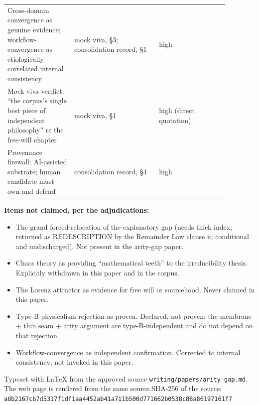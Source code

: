 \documentclass[11pt]{article}
\begin{document}
{\begin{longtable}{>{\raggedright\arraybackslash}p{0.269\linewidth}>{\raggedright\arraybackslash}p{0.333\linewidth}>{\raggedright\arraybackslash}p{0.278\linewidth}}
Cross-domain convergence as genuine evidence; workflow-convergence as etiologically correlated internal consistency & mock viva, §3; consolidation record, §1 & high \\
Mock viva verdict: ``the corpus's single best piece of independent philosophy'' re the free-will chapter & mock viva, §1 & high (direct quotation) \\
Provenance firewall: AI-assisted substrate; human candidate must own and defend & consolidation record, §4 & high \\
\bottomrule\end{longtable}}
\textbf{Items not claimed, per the adjudications:}

\begin{itemize}
\item The grand forced-relocation of the explanatory gap (needs thick index; returned as REDESCRIPTION by the Remainder Law clause ii; conditional and undischarged). Not present in the arity-gap paper.
\item Chaos theory as providing ``mathematical teeth'' to the irreducibility thesis. Explicitly withdrawn in this paper and in the corpus.
\item The Lorenz attractor as evidence for free will or sourcehood. Never claimed in this paper.
\item Type-B physicalism rejection as proven. Declared, not proven; the membrane + thin seam + arity argument are type-B-independent and do not depend on that rejection.
\item Workflow-convergence as independent confirmation. Corrected to internal consistency; not invoked in this paper.
\end{itemize}
\vfill{\footnotesize Typeset with LaTeX from the approved source \texttt{writing/papers/arity-gap.md}. The web page is rendered from the same source.\newline SHA-256 of the source: \texttt{a8b2167cb7d5317f1df1aa4452ab41a711b500d771662b0538c88a86197161f7}\par}
\end{document}
